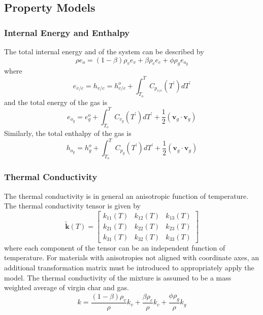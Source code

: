 \subsection{Property Models}
\subsubsection{Internal Energy and Enthalpy}
The total internal energy and of the system can be described by
\begin{equation}
\rho e_{o} = \left(1 - \beta \right)\rho_{v} e_{v} + \beta \rho_{c} e_{c} + \phi \rho_{g} e_{o_{g}}
\end{equation}
where
\begin{equation}
e_{v/c} = h_{v/c} = h_{v/c}^{o} + \int_{T_{o}}^{T} C_{p_{v/c}}\left(T^{\prime}\right)dT^{\prime}
\end{equation}
and the total energy of the gas is
\begin{equation}
e_{o_{g}} = e_{g}^{o} + \int_{T_{o}}^{T} C_{v_{g}}\left(T^{\prime}\right)dT^{\prime} + \frac{1}{2} \left( \mathbf{v}_{g} \cdot \mathbf{v}_{g} \right)
\end{equation}
Similarly, the total enthalpy of the gas is
\begin{equation}
h_{o_{g}} = h_{g}^{o} + \int_{T_{o}}^{T} C_{p_{g}}\left(T^{\prime}\right)dT^{\prime} + \frac{1}{2} \left( \mathbf{v}_{g} \cdot \mathbf{v}_{g} \right)
\end{equation}
\subsubsection{Thermal Conductivity}
The thermal conductivity is in general an anisotropic function of temperature.  The thermal conductivity tensor is given by
\begin{equation}
\widetilde{\textbf{k}}\left(T\right) = \left[ \begin{matrix}
k_{11}\left(T\right) & k_{12}\left(T\right) & k_{13}\left(T\right) \\
k_{21}\left(T\right) & k_{22}\left(T\right) & k_{23}\left(T\right) \\
k_{31}\left(T\right) & k_{32}\left(T\right) & k_{33}\left(T\right) \end{matrix} \right]
\end{equation}
where each component of the tensor can be an independent function of temperature.  For materials with anisotropies not aligned with coordinate axes, an additional transformation matrix must be introduced to appropriately apply the model. 
The thermal conductivity of the mixture is assumed to be a mass weighted average of virgin char and gas.
\begin{equation}
k = \frac{\left(1 - \beta\right) \rho_{v}}{\rho}k_{v} + \frac{\beta \rho_{c}}{\rho} k_{c} + \frac{\phi \rho_{g}}{\rho}k_{g}
\end{equation}
